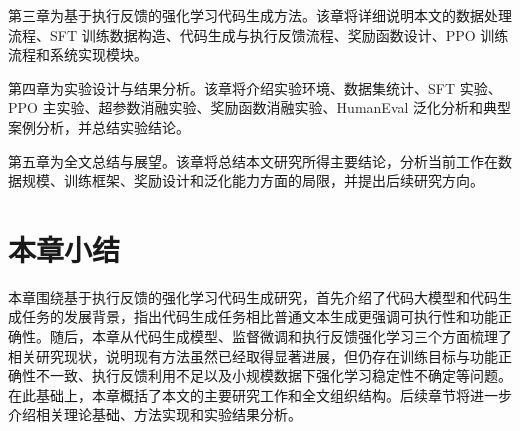 第三章为基于执行反馈的强化学习代码生成方法。该章将详细说明本文的数据处理流程、SFT 训练数据构造、代码生成与执行反馈流程、奖励函数设计、PPO 训练流程和系统实现模块。

第四章为实验设计与结果分析。该章将介绍实验环境、数据集统计、SFT 实验、PPO 主实验、超参数消融实验、奖励函数消融实验、HumanEval 泛化分析和典型案例分析，并总结实验结论。

第五章为全文总结与展望。该章将总结本文研究所得主要结论，分析当前工作在数据规模、训练框架、奖励设计和泛化能力方面的局限，并提出后续研究方向。

\section{本章小结}

本章围绕基于执行反馈的强化学习代码生成研究，首先介绍了代码大模型和代码生成任务的发展背景，指出代码生成任务相比普通文本生成更强调可执行性和功能正确性。随后，本章从代码生成模型、监督微调和执行反馈强化学习三个方面梳理了相关研究现状，说明现有方法虽然已经取得显著进展，但仍存在训练目标与功能正确性不一致、执行反馈利用不足以及小规模数据下强化学习稳定性不确定等问题。在此基础上，本章概括了本文的主要研究工作和全文组织结构。后续章节将进一步介绍相关理论基础、方法实现和实验结果分析。

